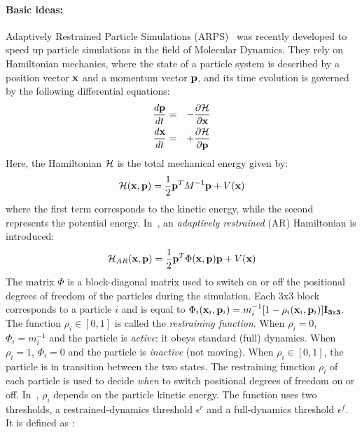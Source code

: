 \paragraph*{Basic ideas:}
Adaptively Restrained Particle Simulations (ARPS)~\cite{Artemova2012} was recently developed to speed up particle simulations in the field of Molecular Dynamics.
They rely on Hamiltonian mechanics, where the state of a particle system is described by a position vector $\mathbf{x}$ and a momentum vector $\mathbf{p}$, and its time evolution is governed by the following differential equations:
\begin{eqnarray*}
\frac{d\mathbf{p}}{dt} &=& -\frac{\partial \mathcal{H}}{\partial \mathbf{x}} \\
\frac{d\mathbf{x}}{dt} &=& +\frac{\partial \mathcal{H}}{\partial \mathbf{p}}
\end{eqnarray*}
Here, the Hamiltonian $\mathcal{H}$ is the total mechanical energy given by:
\begin{equation}
    \label{eq:hamiltonian}
    \mathcal{H}(\mathbf{x},\mathbf{p}) = \frac{1}{2} \mathbf{p}^{T}M^{-1}\mathbf{p} + V(\mathbf{x})
\end{equation}
where the first term corresponds to the kinetic energy, while the second represents the potential energy.
In~\cite{Artemova2012}, an \textit{adaptively restrained} (AR) Hamiltonian is introduced:
\begin{equation}
    \label{eq:arhamiltonian}
    \mathcal{H}_{AR}(\mathbf{x}, \mathbf{p}) = \frac{1}{2} \mathbf{p}^{T}\Phi(\mathbf{x},\mathbf{p})\mathbf{p} + V(\mathbf{x})
\end{equation}
The matrix $\Phi$ is a block-diagonal matrix used to switch on or off the positional degrees of freedom of the particles during the simulation.
Each $3$x$3$ block corresponds to a particle $i$ and is equal to
$\Phi_{i}(\mathbf{x}_{i}, \mathbf{p}_{i}) = m_{i}^{-1}[1 - \rho_{i}(\mathbf{x}_{i}, \mathbf{p}_{i})]\mathbf{I_{3\mathtt{x}3}}$.
The function $\rho_{i} \in [0, 1]$ is called the \emph{restraining function}.
When $\rho_{i} = 0$, $\Phi_{i} = m_{i}^{-1}$ and the particle is \textit{active}: it obeys standard (full) dynamics.
When $\rho_{i} = 1$, $\Phi_{i} = 0$ and the particle is \textit{inactive} (not moving). When $\rho_{i} \in [0, 1]$, the particle is in transition between the two states.
The restraining function $\rho_{i}$ of each particle is used to decide \emph{when} to switch positional degrees of freedom on or off.
In~\cite{Artemova2012}, $\rho_{i}$ depends on the particle kinetic energy.
The function uses two thresholds, a restrained-dynamics threshold $\epsilon^{r}$ and a full-dynamics threshold $\epsilon^{f}$.
It is defined as :
